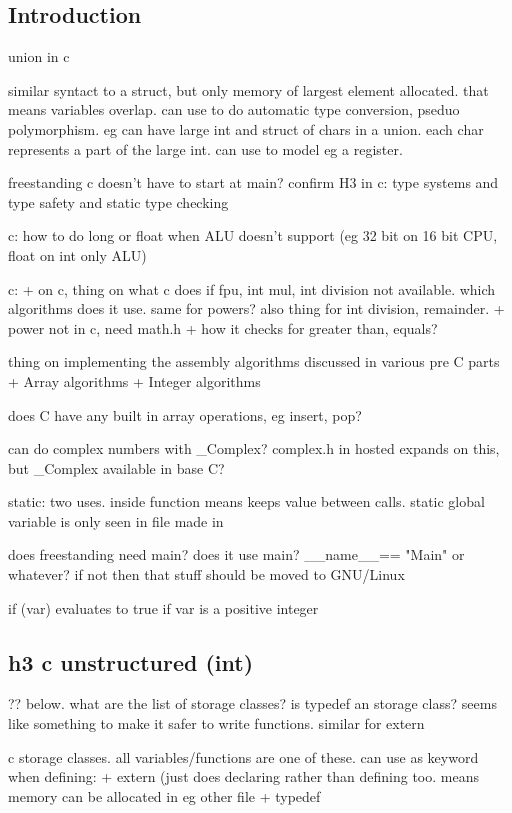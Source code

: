 
\subsection{Introduction}


union in c

similar syntact to a struct, but only memory of largest element allocated. that means variables overlap. can use to do automatic type conversion, pseduo polymorphism. eg can have large int and 
struct of chars in a union. each char represents a part of the large int. can use to model eg a register.

freestanding c doesn't have to start at main? confirm
H3 in c: type systems and type safety and static type checking

c: how to do long or float when ALU doesn't support (eg 32 bit on 16 bit CPU, float on int only ALU)

c:
+ on c, thing on what c does if fpu, int mul, int division not available. which algorithms does it use. same for powers? also thing for int division, remainder.
+ power not in c, need math.h
+ how it checks for greater than, equals?

thing on implementing the assembly algorithms discussed in various pre C parts
+ Array algorithms
+ Integer algorithms

does C have any built in array operations, eg insert, pop?

can do complex numbers with \_Complex? complex.h in hosted expands on this, but \_Complex available in base C?

static: two uses. inside function means keeps value between calls. static global variable is only seen in file made in

does freestanding need main? does it use main? \_\_name\_\_== "Main" or whatever?
if not then that stuff should be moved to GNU/Linux

if (var) evaluates to true if var is a positive integer

\subsection{h3 c unstructured (int)}

?? below. what are the list of storage classes? is typedef an storage class? seems like something to make it safer to write functions. similar for extern

c storage classes. all variables/functions are one of these. can use as keyword when defining:
+ extern (just does declaring rather than defining too. means memory can be allocated in eg other file
+ typedef


